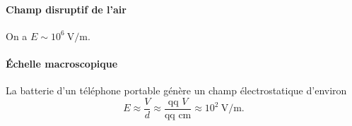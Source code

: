         \paragraph{Champ disruptif de l'air}

            On a $E\sim 10^{6}~\si{\volt\per\metre}$.

        \paragraph{Échelle macroscopique}

            La batterie d'un téléphone portable génère un champ électrostatique d'environ
            \begin{equation}
                E\approx \frac{V}{d}\approx \frac{\text{qq } V}{\text{qq } \si{\centi\metre}}\approx10^{2}~\si{\volt\per\metre}.
            \end{equation}